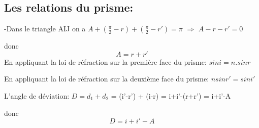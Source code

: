 \documentclass[12pt]{article}
\begin{document}
\subsection{Les relations du prisme: }

-Dans le triangle AIJ on a $A +(\frac{\pi}{2} - r) + (\frac{\pi}{2} - r') = \pi $ $\Rightarrow$ $A-r-r' = 0$ 

donc $$A=r+r'$$
En appliquant la loi de réfraction sur la première face du prisme: $sin i = n.sin r$

En appliquant la loi de réfraction sur la deuxième face du prisme: $nsin r' = sin i'$

L'angle de déviation: $D =d_1 + d_2$ = (i'-r') + (i-r) = i+i'-(r+r') = i+i'-A

donc $$D = i + i' -A $$











\end{document}
